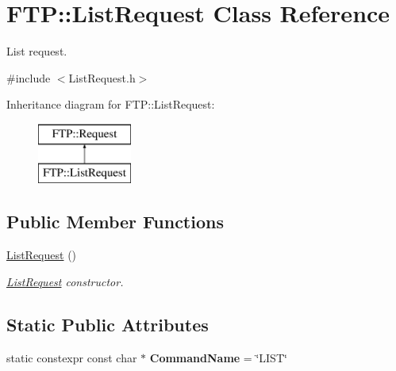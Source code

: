 \hypertarget{classFTP_1_1ListRequest}{}\section{F\+T\+P\+:\+:List\+Request Class Reference}
\label{classFTP_1_1ListRequest}


List request.  




{\ttfamily \#include $<$List\+Request.\+h$>$}

Inheritance diagram for F\+T\+P\+:\+:List\+Request\+:\begin{figure}[H]
\begin{center}
\leavevmode
\includegraphics[height=2.000000cm]{classFTP_1_1ListRequest}
\end{center}
\end{figure}
\subsection*{Public Member Functions}
\begin{DoxyCompactItemize}
\item 
\hypertarget{classFTP_1_1ListRequest_aa6b1eb7e03533491a28bf8ba800e1989}{}\hyperlink{classFTP_1_1ListRequest_aa6b1eb7e03533491a28bf8ba800e1989}{List\+Request} ()\label{classFTP_1_1ListRequest_aa6b1eb7e03533491a28bf8ba800e1989}

\begin{DoxyCompactList}\small\item\em \hyperlink{classFTP_1_1ListRequest}{List\+Request} constructor. \end{DoxyCompactList}\end{DoxyCompactItemize}
\subsection*{Static Public Attributes}
\begin{DoxyCompactItemize}
\item 
\hypertarget{classFTP_1_1ListRequest_ac8ac654082b68fbb98934517c0387f67}{}static constexpr const char $\ast$ {\bfseries Command\+Name} = \char`\"{}L\+I\+S\+T\char`\"{}\label{classFTP_1_1ListRequest_ac8ac654082b68fbb98934517c0387f67}

\end{DoxyCompactItemize}


